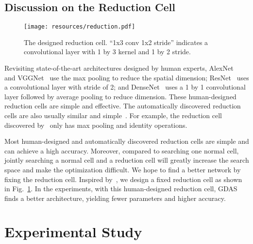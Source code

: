 \documentclass[10pt,twocolumn,letterpaper]{article}
\def\Figref#1{Fig.~\ref{#1}}
\begin{document}
\subsection{Discussion on the Reduction Cell}\label{sec:method-reduction}


\begin{figure}[t!]
\begin{center}
\texttt{[image: resources/reduction.pdf]}
\end{center}
\caption[Captioning]{
The designed reduction cell.
``1x3 conv 1x2 stride'' indicates a convolutional layer with 1 by 3 kernel and 1 by 2 stride.
}
\vspace{-2mm}
\label{fig:reduction}
\end{figure}


Revisiting state-of-the-art architectures designed by human experts, AlexNet~\cite{krizhevsky2012imagenet} and VGGNet~\cite{simonyan2015very} use the max pooling to reduce the spatial dimension; ResNet~\cite{he2016deep} uses a convolutional layer with stride of 2; and DenseNet~\cite{huang2017densely} uses a 1 by 1 convolutional layer followed by average pooling to reduce dimension.
These human-designed reduction cells are simple and effective.
The automatically discovered reduction cells are also usually similar and simple~\cite{Zoph_2018_CVPR,pmlr-v80-pham18a,liu2019darts}. For example, the reduction cell discovered by~\cite{liu2019darts} only has max pooling and identity operations.


Most human-designed and automatically discovered reduction cells are simple and can achieve a high accuracy.
Moreover, compared to searching one normal cell, jointly searching a normal cell and a reduction cell will greatly increase the search space and make the optimization difficult.
We hope to find a better network by fixing the reduction cell.
Inspired by~\cite{simonyan2015very,liu2019darts}, we design a fixed reduction cell as shown in \Figref{fig:reduction}.
In the experiments, with this human-designed reduction cell, GDAS finds a better architecture, yielding fewer parameters and higher accuracy.















\section{Experimental Study}
\end{document}
